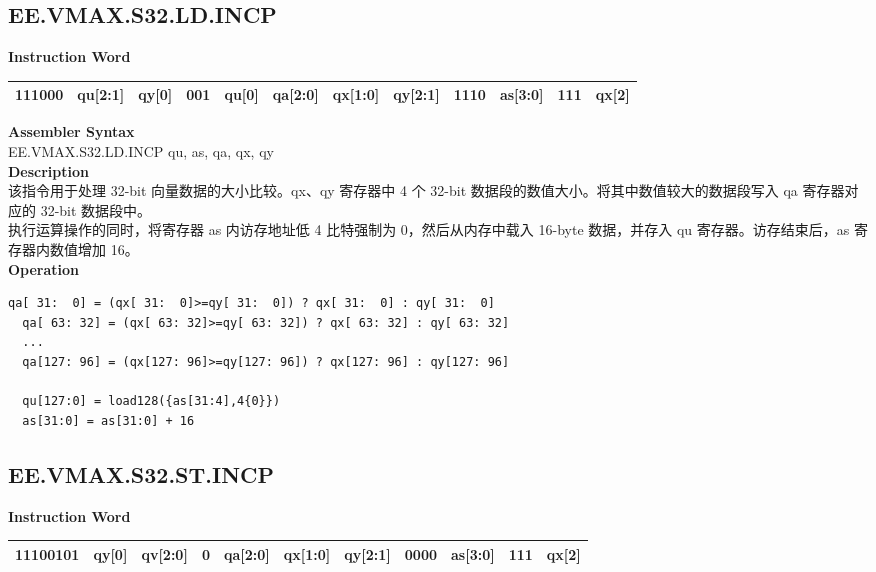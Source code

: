 \clearpage
\subsection{EE.VMAX.S32.LD.INCP}\label{instruction:EEVMAXS32LDINCP}
\setlength\tabcolsep{6pt}
\textbf{Instruction Word} \\
\begin{tabular}{|c|c|c|c|c|c|c|c|c|c|c|c|}
	\hline
	111000 & qu[2:1] & qy[0] & 001 & qu[0] & qa[2:0] & qx[1:0] & qy[2:1] & 1110 & as[3:0] & 111 & qx[2] \\
	\hline
\end{tabular}

\textbf{Assembler Syntax} \\
EE.VMAX.S32.LD.INCP qu, as, qa, qx, qy \\
\textbf{Description} \\
该指令用于处理 32-bit 向量数据的大小比较。qx、qy 寄存器中 4 个 32-bit 数据段的数值大小。将其中数值较大的数据段写入 qa 寄存器对应的 32-bit 数据段中。\\
执行运算操作的同时，将寄存器 as 内访存地址低 4 比特强制为 0，然后从内存中载入 16-byte 数据，并存入 qu 寄存器。访存结束后，as 寄存器内数值增加 16。\\
\textbf{Operation}
\begin{lstlisting}[escapeinside=`?]
  qa[ 31:  0] = (qx[ 31:  0]>=qy[ 31:  0]) ? qx[ 31:  0] : qy[ 31:  0]
  qa[ 63: 32] = (qx[ 63: 32]>=qy[ 63: 32]) ? qx[ 63: 32] : qy[ 63: 32]
  ...
  qa[127: 96] = (qx[127: 96]>=qy[127: 96]) ? qx[127: 96] : qy[127: 96]

  qu[127:0] = load128({as[31:4],4{0}})
  as[31:0] = as[31:0] + 16
\end{lstlisting}

\clearpage
\subsection{EE.VMAX.S32.ST.INCP}\label{instruction:EEVMAXS32STINCP}
\setlength\tabcolsep{6pt}
\textbf{Instruction Word} \\
\begin{tabular}{|c|c|c|c|c|c|c|c|c|c|c|}
	\hline
	11100101 & qy[0] & qv[2:0] & 0 & qa[2:0] & qx[1:0] & qy[2:1] & 0000 & as[3:0] & 111 & qx[2] \\
	\hline
\end{tabular}

